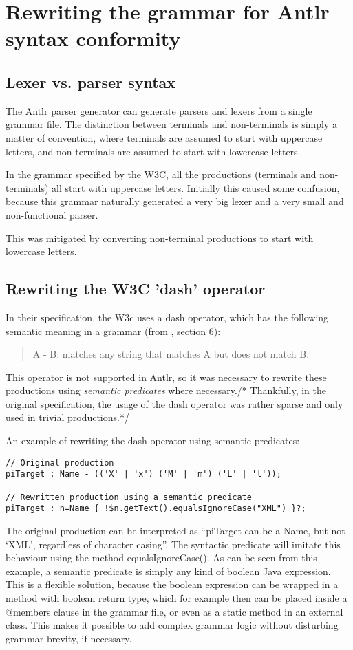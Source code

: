 \section{Rewriting the grammar for Antlr syntax conformity}
\subsection{Lexer vs. parser syntax}
The Antlr parser generator can generate parsers and lexers from a single grammar
file. The distinction between terminals and non-terminals is simply a matter of
convention, where terminals are assumed to start with uppercase letters, and
non-terminals are assumed to start with lowercase letters.

In the grammar specified by the W3C, all the productions (terminals and
non-terminals) all start with uppercase letters. Initially this caused some
confusion, because this grammar naturally generated a very big lexer and a very
small and non-functional parser.

This was mitigated by converting non-terminal productions to start with
lowercase letters.

\subsection{Rewriting the W3C 'dash' operator}
In their specification, the W3c uses a dash operator, which has the following
semantic meaning in a grammar (from \cite{w3c03}, section 6):
\begin{quote}
A - B: matches any string that matches A but does not match B.
\end{quote}
This operator is not supported in Antlr, so it was necessary to rewrite
these productions using \emph{semantic predicates} where necessary./* Thankfully,
in the original specification, the usage of the dash operator was rather sparse
and only used in trivial productions.*/

An example of rewriting the dash operator using semantic predicates:
\begin{verbatim}
// Original production
piTarget : Name - (('X' | 'x') ('M' | 'm') ('L' | 'l'));

// Rewritten production using a semantic predicate
piTarget : n=Name { !$n.getText().equalsIgnoreCase("XML") }?;
\end{verbatim}
The original production can be interpreted as ``piTarget can be a Name, but not
`XML', regardless of character casing''. The syntactic predicate will imitate
this behaviour using the method equalsIgnoreCase(). As can be seen from this
example, a semantic predicate is simply any kind of boolean Java expression.
This is a flexible solution, because the boolean expression can be wrapped in a
method with boolean return type, which for example then can be placed inside a
@members { } clause in the grammar file, or even as a static method in an
external class. This makes it possible to add complex grammar logic without
disturbing grammar brevity, if necessary.

